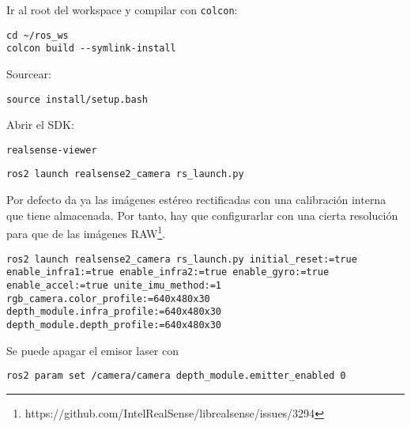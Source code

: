 \documentclass[apunte]{lcc}
\begin{document}
Ir al root del workspace y compilar con \lstinline{colcon}:
\begin{lstlisting}[style=bash]
cd ~/ros_ws
colcon build --symlink-install
\end{lstlisting}

Sourcear:
\begin{lstlisting}[style=bash]
source install/setup.bash
\end{lstlisting}

Abrir el SDK:
\begin{lstlisting}[style=bash]
realsense-viewer
\end{lstlisting}

\begin{lstlisting}[style=bash]
ros2 launch realsense2_camera rs_launch.py
\end{lstlisting}

Por defecto da ya las imágenes estéreo rectificadas con una calibración interna que tiene almacenada. Por tanto, hay que configurarlar con una cierta resolución para que de las imágenes RAW\footnote{https://github.com/IntelRealSense/librealsense/issues/3294}.

\begin{lstlisting}[style=bash]
ros2 launch realsense2_camera rs_launch.py initial_reset:=true enable_infra1:=true enable_infra2:=true enable_gyro:=true enable_accel:=true unite_imu_method:=1 rgb_camera.color_profile:=640x480x30 depth_module.infra_profile:=640x480x30 depth_module.depth_profile:=640x480x30
\end{lstlisting}

Se puede apagar el emisor laser con

\begin{lstlisting}[style=bash]
ros2 param set /camera/camera depth_module.emitter_enabled 0
\end{lstlisting}
\end{document}
